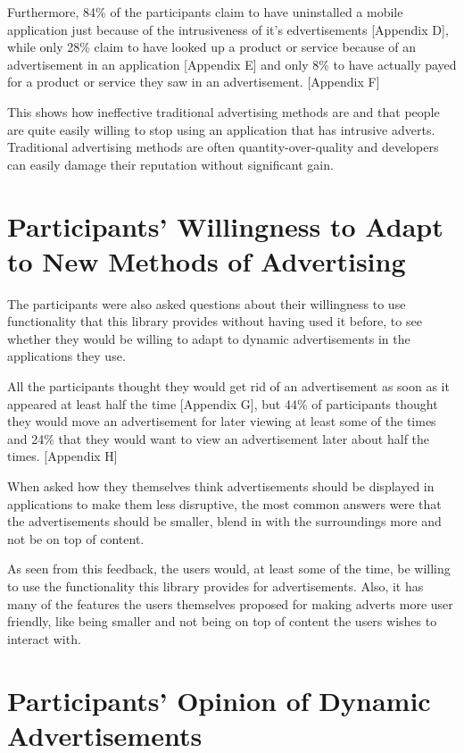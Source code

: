 Furthermore, 84\% of the participants claim to have uninstalled a mobile application just because of the intrusiveness of it's edvertisements [Appendix D], while only 28\% claim to have looked up a product or service because of an advertisement in an application [Appendix E] and only 8\% to have actually payed for a product or service they saw in an advertisement. [Appendix F]

This shows how ineffective traditional advertising methods are and that people are quite easily willing to stop using an application that has intrusive adverts. Traditional advertising methods are often quantity-over-quality and developers can easily damage their reputation without significant gain.

\section{Participants' Willingness to Adapt to New Methods of Advertising}

The participants were also asked questions about their willingness to use functionality that this library provides without having used it before, to see whether they would be willing to adapt to dynamic advertisements in the applications they use.

All the participants thought they would get rid of an advertisement as soon as it appeared at least half the time [Appendix G], but 44\% of participants thought they would move an advertisement for later viewing at least some of the times and 24\% that they would want to view an advertisement later about half the times. [Appendix H]

When asked how they themselves think advertisements should be displayed in applications to make them less disruptive, the most common answers were that the advertisements should be smaller, blend in with the surroundings more and not be on top of content.

As seen from this feedback, the users would, at least some of the time, be willing to use the functionality this library provides for advertisements. Also, it has many of the features the users themselves proposed for making adverts more user friendly, like being smaller and not being on top of content the users wishes to interact with.

\section{Participants' Opinion of Dynamic Advertisements}


